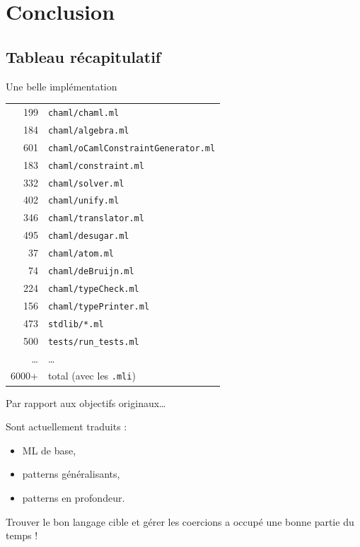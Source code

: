 \documentclass[final]{beamer}
\begin{document}
\section{Conclusion}

\subsection{Tableau récapitulatif}

\begin{frame}{Une belle implémentation}

  \footnotesize

  \begin{tabular}{rl}
    199 & \texttt{chaml/chaml.ml} \\
    184 & \texttt{chaml/algebra.ml} \\
    601 & \texttt{chaml/oCamlConstraintGenerator.ml} \\
    183 & \texttt{chaml/constraint.ml} \\
    332 & \texttt{chaml/solver.ml} \\
    402 & \texttt{chaml/unify.ml} \\
    346 & \texttt{chaml/translator.ml} \\
    495 & \texttt{chaml/desugar.ml} \\
    37 & \texttt{chaml/atom.ml} \\
    74 & \texttt{chaml/deBruijn.ml} \\
    224 & \texttt{chaml/typeCheck.ml} \\
    156 & \texttt{chaml/typePrinter.ml} \\
    473 & \texttt{stdlib/*.ml} \\
    500 & \texttt{tests/run\_tests.ml} \\
    \dots & \dots \\
  6000+ & total (avec les \texttt{.mli})
  \end{tabular}

\end{frame}

\begin{frame}{Par rapport aux objectifs originaux\dots}

  Sont actuellement traduits :
  \begin{itemize}
    \item ML de base,
    \item patterns généralisants,
    \item patterns en profondeur.
  \end{itemize}

  Trouver le bon langage cible et gérer les coercions a occupé une bonne partie
  du temps !

\end{frame}
\end{document}
